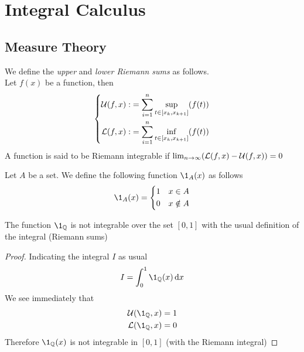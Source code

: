 \documentclass[../complete.tex]{subfiles}
\begin{document}
\chapter{Integral Calculus}
\section{Measure Theory}
\begin{dfn}
	We define the \textit{upper} and \textit{lower Riemann sums} as follows.\\
	Let $f(x)$ be a function, then
	\begin{equation}
		\left\{\begin{aligned}
				\operatorname{\mathcal{U}}(f,x):&=\sum_{i=1}^n\sup_{t\in[x_k,x_{k+1}]}(f(t))\\
				\operatorname{\mathcal{L}}(f,x):&=\sum_{i=1}^n\inf_{t\in[x_k,x_{k+1}]}(f(t))
		\end{aligned}\right.
		\label{eq:upperlowersums}
	\end{equation}
	A function is said to be Riemann integrable if $\lim_{n\to\infty}(\operatorname{\mathcal{L}}(f,x)-\operatorname{\mathcal{U}}(f,x))=0$
\end{dfn}
\begin{dfn}
	Let $A$ be a set. We define the following function $\1_A(x)$ as follows
	\begin{equation}
		\1_A(x)=\begin{dcases}1&x\in A\\0&x\notin A\end{dcases}
		\label{eq:setfunc}
	\end{equation}
\end{dfn}
\begin{thm}
	The function $\1_{\Q}$ is not integrable over the set $[0,1]$ with the usual definition of the integral (Riemann sums)
\end{thm}
\begin{proof}
	Indicating the integral $I$ as usual
	\begin{equation*}
		I=\int_{0}^{1}\1_{\Q}(x)\diff x
	\end{equation*}
	We see immediately that
	\begin{equation*}
		\begin{aligned}
			\Us(\1_{\Q},x)&=1\\
			\Ls(\1_{\Q},x)&=0
		\end{aligned}
	\end{equation*}
	Therefore $\1_{\Q}(x)$ is not integrable in $[0,1]$ (with the Riemann integral)
\end{proof}
\end{document}
